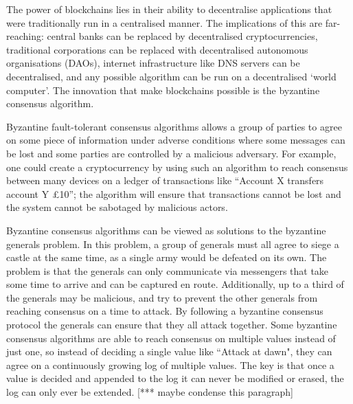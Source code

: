 

The power of blockchains lies in their ability to decentralise applications that were traditionally run in a centralised manner. The implications of this are far-reaching: central banks can be replaced by decentralised cryptocurrencies, traditional corporations can be replaced with decentralised autonomous organisations (DAOs), internet infrastructure like DNS servers can be decentralised, and any possible algorithm can be run on a decentralised `world computer'. The innovation that make blockchains possible is the byzantine consensus algorithm.

Byzantine fault-tolerant consensus algorithms allows a group of parties to agree on some piece of information under adverse conditions where some messages can be lost and some parties are controlled by a malicious adversary. For example, one could create a cryptocurrency by using such an algorithm to reach consensus between many devices on a ledger of transactions like ``Account X transfers account Y £10''; the algorithm will ensure that transactions cannot be lost and the system cannot be sabotaged by malicious actors.

Byzantine consensus algorithms can be viewed as solutions to the byzantine generals problem. In this problem, a group of generals must all agree to siege a castle at the same time, as a single army would be defeated on its own. The problem is that the generals can only communicate via messengers that take some time to arrive and can be captured en route. Additionally, up to a third of the generals may be malicious, and try to prevent the other generals from reaching consensus on a time to attack. By following a byzantine consensus protocol the generals can ensure that they all attack together. Some byzantine consensus algorithms are able to reach consensus on multiple values instead of just one, so instead of deciding a single value like ``Attack at dawn", they can agree on a continuously growing log of multiple values. The key is that once a value is decided and appended to the log it can never be modified or erased, the log can only ever be extended. [*** maybe condense this paragraph]

